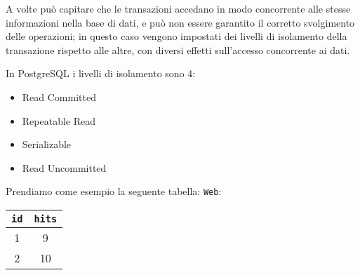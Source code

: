 \documentclass[a4paper, 10pt]{article}
\begin{document}
	A volte può capitare che le transazioni accedano in modo concorrente alle stesse informazioni nella base di dati, e può non essere garantito il corretto svolgimento delle operazioni; in questo caso vengono impostati dei livelli di isolamento della transazione rispetto alle altre, con diversi effetti sull'accesso concorrente ai dati.
	
		In PostgreSQL i livelli di isolamento sono 4:
		\begin{itemize}
			\item Read Committed
			\item Repeatable Read
			\item Serializable
			\item Read Uncommitted
		\end{itemize}
		Prendiamo come esempio la seguente tabella:
		\lstinline|Web|:
		\begin{tabular}{cc}
			\toprule
			\lstinline|id| & \lstinline|hits| \\
			\midrule
			1 & 9 \\
			2 & 10 \\
			\midrule
		\end{tabular}
		
\end{document}
